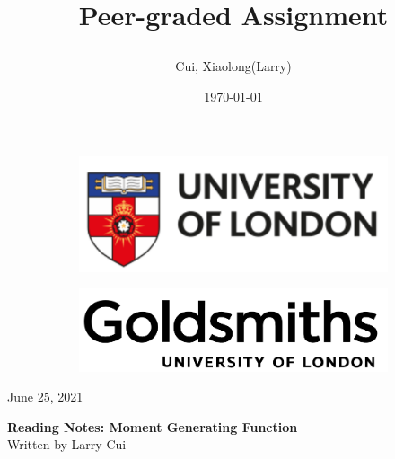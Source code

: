 \documentclass[12pt]{article}
\title{\vspace{-90pt} 



\textbf  {Peer-graded Assignment} }
\author{Cui, Xiaolong(Larry)}
\date{\today}
\begin{document}

\thispagestyle{plain}


\begin{figure}[H] %
  \begin{subfigure}{0.3\textwidth}
    \includegraphics[width=\textwidth]{uol}
  \end{subfigure}
  \hfill
  \begin{subfigure}{0.3\textwidth}
    \includegraphics[width=\textwidth]{goldsmiths}
  \end{subfigure}
\end{figure}


\begin{flushright}

\footnotesize {June 25, 2021}
\end{flushright}

\begin{center}
\textbf{Reading Notes: Moment Generating Function} \\
\footnotesize {Written by Larry Cui}
\end{center}

\end{document}
